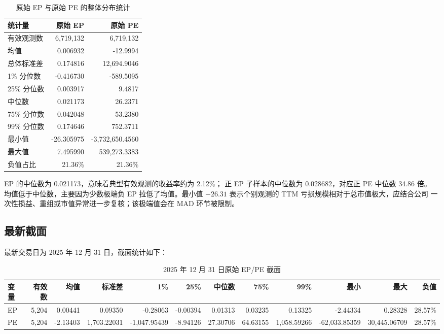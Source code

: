 \documentclass[UTF8,a4paper,11pt]{ctexart}
\begin{document}
\begin{table}[H]
\centering
\caption{原始 EP 与原始 PE 的整体分布统计}
\begin{tabular}{lrr}
\toprule
统计量 & 原始 EP & 原始 PE \\
\midrule
有效观测数 & 6,719,132 & 6,719,132 \\
均值 & 0.006932 & -12.9994 \\
总体标准差 & 0.174816 & 12,694.9046 \\
1\% 分位数 & -0.416730 & -589.5095 \\
25\% 分位数 & 0.003917 & 9.4817 \\
中位数 & 0.021173 & 26.2371 \\
75\% 分位数 & 0.042048 & 53.2380 \\
99\% 分位数 & 0.174646 & 752.3711 \\
最小值 & -26.305975 & -3,732,650.4560 \\
最大值 & 7.495990 & 539,273.3383 \\
负值占比 & 21.36\% & 21.36\% \\
\bottomrule
\end{tabular}
\end{table}

EP 的中位数为 0.021173，意味着典型有效观测的收益率约为 2.12\%；
正 EP 子样本的中位数为 0.028682，对应正 PE 中位数 34.86 倍。
均值低于中位数，主要因为少数极端负 EP 拉低了均值。最小值
$-26.31$ 表示个别观测的 TTM 亏损规模相对于总市值极大，应结合公司
一次性损益、重组或市值异常进一步复核；该极端值会在 MAD 环节被限制。

\subsection{最新截面}

最新交易日为 2025 年 12 月 31 日，截面统计如下：

\begin{table}[H]
\centering
\caption{2025 年 12 月 31 日原始 EP/PE 截面}
\scriptsize
\setlength{\tabcolsep}{2pt}
\begin{tabular}{lrrrrrrrrrrr}
\toprule
变量 & 有效数 & 均值 & 标准差 & 1\% & 25\% & 中位数 & 75\% & 99\% & 最小 & 最大 & 负值 \\
\midrule
EP & 5,204 & 0.00441 & 0.09350 & -0.28063 & -0.00394 & 0.01313 & 0.03235 & 0.13325 & -2.44334 & 0.28328 & 28.57\% \\
PE & 5,204 & -2.13403 & 1,703.22031 & -1,047.95439 & -8.94126 & 27.30706 & 64.63155 & 1,058.59266 & -62,033.85359 & 30,445.06709 & 28.57\% \\
\bottomrule
\end{tabular}
\end{table}
\end{document}
